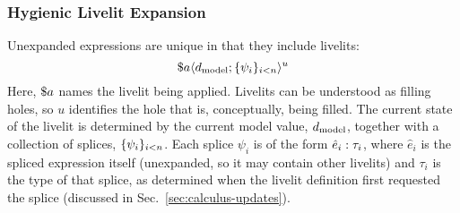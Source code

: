 \subsubsection{Hygienic Livelit Expansion}
Unexpanded expressions are unique in that they include livelits:
 \[\haplivelit{u}{a}{\dtxt{model}}{\splices}\]
Here, $\livelitname{a}$ names the livelit
 being applied. Livelits can be understood as filling holes, so $u$ identifies the hole
 that is, conceptually, being filled.
The current state of the livelit is determined by the current model value, $\dtxt{model}$,
together with a collection of splices, $\splices$. Each splice $\psi_i$
is of the form $\hsplice{\hat e_i}{\tau_i}$, where $\hat e_i$ is the spliced expression
itself (unexpanded, so it may contain other livelits) and $\tau_i$ is the type of that splice,
as determined when the livelit definition first requested the splice (discussed in Sec.~\ref{sec:calculus-updates}).

